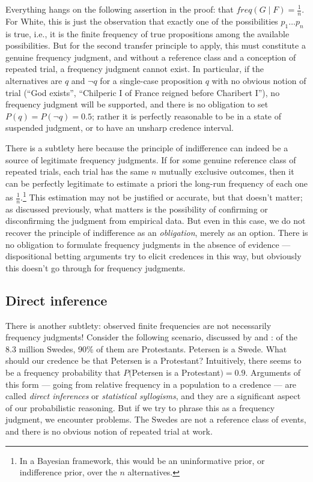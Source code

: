 \documentclass[letterpaper,12pt]{article}
\begin{document}
Everything hangs on the following assertion in the proof: that $\mathit{freq}(G \mid F) = \frac{1}{n}$. For White, this is just the observation that exactly one of the possibilities $p_1 \ldots p_n$ is true, i.e., it is the finite frequency of true propositions among the available possibilities. But for the second transfer principle to apply, this must constitute a genuine frequency judgment, and without a reference class and a conception of repeated trial, a frequency judgment cannot exist. In particular, if the alternatives are $q$ and $\neg q$ for a single-case proposition $q$ with no obvious notion of trial (``God exists'', ``Chilperic I of France reigned before Charibert I''), no frequency judgment will be supported, and there is no obligation to set $P(q) = P(\neg q) = 0.5$; rather it is perfectly reasonable to be in a state of suspended judgment, or to have an unsharp credence interval.

There is a subtlety here because the principle of indifference can indeed be a source of legitimate frequency judgments. If for some genuine reference class of repeated trials, each trial has the same $n$ mutually exclusive outcomes, then it can be perfectly legitimate to estimate a priori the long-run frequency of each one as $\frac{1}{n}$.\footnote{In a Bayesian framework, this would be an uninformative prior, or indifference prior, over the $n$ alternatives.} This estimation may not be justified or accurate, but that doesn't matter; as discussed previously, what matters is the possibility of confirming or disconfirming the judgment from empirical data. But even in this case, we do not recover the principle of indifference as an \emph{obligation}, merely as an option. There is no obligation to formulate frequency judgments in the absence of evidence --- dispositional betting arguments try to elicit credences in this way, but obviously this doesn't go through for frequency judgments.

\subsection{Direct inference}
\label{sec:directInference}
There is another subtlety: observed finite frequencies are not necessarily frequency judgments! Consider the following scenario, discussed by \cite{Levi1977-LEVDI} and \cite{KyburgJr1977-HENRAT}: of the 8.3 million Swedes, 90\% of them are Protestants. Petersen is a Swede. What should our credence be that Petersen is a Protestant? Intuitively, there seems to be a frequency probability that $P($Petersen is a Protestant$) = 0.9$. Arguments of this form --- going from relative frequency in a population to a credence --- are called \emph{direct inferences} or \emph{statistical syllogisms}, and they are a significant aspect of our probabilistic reasoning. But if we try to phrase this as a frequency judgment, we encounter problems. The Swedes are not a reference class of events, and there is no obvious notion of repeated trial at work.
\end{document}
